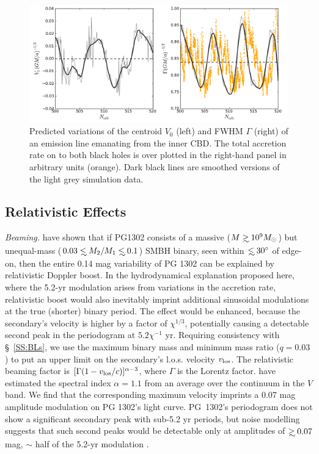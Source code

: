 \begin{figure}
\begin{center}
\includegraphics[scale=0.30]{figures/ch3/fig4}  \vspace{-25 pt}
\end{center}
\caption{Predicted variations of the centroid $V_0$ (left) and FWHM
  $\Gamma$ (right) of an emission line emanating from the inner 
  CBD. The total accretion rate on to both black
  holes is over plotted in the right-hand panel in arbitrary units
  (orange). Dark black lines are smoothed versions of the light grey
  simulation data.}
\label{Fig:BLs}
\end{figure}




\subsection{Relativistic Effects}
\label{SS:Rel}

{\em Beaming.} 
\citet{DHS+2015} have shown that if PG1302 consists of
a massive ($M\gsim 10^{9} \Msun$) but unequal-mass ($0.03 \lsim
M_2/M_1 \lsim 0.1$) SMBH binary, seen within $\lsim 30^{\circ}$ of
edge-on, then the entire 0.14 mag variability of PG 1302 can be
explained by relativistic Doppler boost.  In the hydrodynamical
explanation proposed here, where the 5.2-yr modulation arises from
variations in the accretion rate, relativistic boost would also
inevitably imprint additional sinusoidal modulations at the true
(shorter) binary period. The effect would be enhanced, because the
secondary's velocity is higher by a factor of $\chi^{1/3}$,
potentially causing a detectable second peak in the periodogram at
$5.2\chi^{-1}$ yr.  Requiring consistency with \S~\ref{SS:BLs}, we
use the maximum binary mass and minimum mass ratio ($q=0.03$) to put an
upper limit on the secondary's l.o.s. velocity $v_{\rm{los}}$.
The relativistic beaming factor is
$[\Gamma(1-v_{\rm{los}}/c)]^{\alpha-3}$, where $\Gamma$ is the Lorentz
factor. \citet{DHS+2015} have estimated the spectral index $\alpha=1.1$
from an average over the continuum in the $V$ band.  We find that the
corresponding maximum velocity imprints a 0.07 mag amplitude
modulation on PG 1302's light curve. PG~1302's periodogram does not
show a significant secondary peak with sub-5.2 yr periods, but noise
modelling suggests that such second peaks would be detectable only at
amplitudes of $\gsim0.07$mag, $\sim$ half of the 5.2-yr modulation
\citep[][see the next section]{Charisi:2015:PG1302}.   



